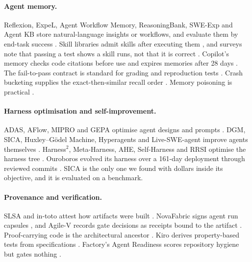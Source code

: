 \documentclass[11pt]{article}
\theoremstyle{remark}
\begin{document}
\paragraph{Agent memory.}
Reflexion, ExpeL, Agent Workflow Memory, ReasoningBank, SWE-Exp and Agent KB store natural-language insights or workflows, and evaluate them by end-task success \citep{shinn2023reflexion,zhao2023expel,wang2024awm,ouyang2025reasoningbank,swe-exp2025,agentkb2025}. Skill libraries admit skills after executing them \citep{wang2023voyager,skillcraft2026,skillfoundry2026}, and surveys note that passing a test shows a skill runs, not that it is correct \citep{skillsurvey2026a,skillsurvey2026b}. Copilot's memory checks code citations before use and expires memories after 28 days \citep{github2026memory}. The fail-to-pass contract is standard for grading and reproduction tests \citep{jimenez2023swebench,mundler2024swtbench}. Crash bucketing supplies the exact-then-similar recall order \citep{glerum2009wer,rodrigues2022tracesim}. Memory poisoning is practical \citep{chen2024agentpoison,dong2025minja}.

\paragraph{Harness optimisation and self-improvement.}
ADAS, AFlow, MIPRO and GEPA optimise agent designs and prompts \citep{hu2024adas,zhang2024aflow,opsahlong2024mipro,agrawal2025gepa}. DGM, SICA, Huxley--G\"odel Machine, Hyperagents and Live-SWE-agent improve agents themselves \citep{zhang2025dgm,robeyns2025sica,hgm2025,hyperagents2026,liveswe2025}. Harness$^2$, Meta-Harness, AHE, Self-Harness and RRSI optimise the harness tree \citep{xu2026harness2,metaharness2026,ahe2026,selfharness2026,rrsi2026}. Ouroboros evolved its harness over a 161-day deployment through reviewed commits \citep{ouroboros2026}. SICA is the only one we found with dollars inside its objective, and it is evaluated on a benchmark.

\paragraph{Provenance and verification.}
SLSA and in-toto attest how artifacts were built \citep{slsa,torresarias2019intoto}. NovaFabric signs agent run capsules \citep{novafabric2026}, and Agile-V records gate decisions as receipts bound to the artifact \citep{koch2026agilev}. Proof-carrying code is the architectural ancestor \citep{necula1997pcc}. Kiro derives property-based tests from specifications \citep{kiro2026pbt}. Factory's Agent Readiness scores repository hygiene but gates nothing \citep{factory2026readiness}.
\end{document}
